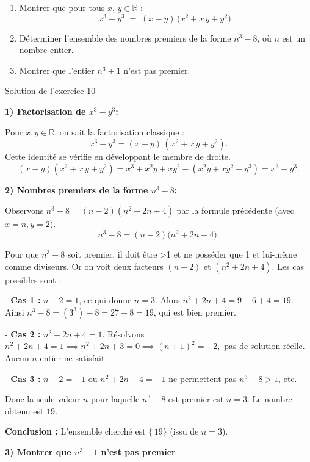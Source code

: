 \documentclass[a4paper,12pt]{article}
\begin{document}
\begin{exercice}[title=Exercice 10 $\star\star$ {[Calculer]}]
\begin{enumerate}
  \item Montrer que pour tous $x,\,y \in \mathbb{R}$ :
    $$
    x^3 - y^3 \;=\;(x - y)\,\bigl(x^2 + x\,y + y^2\bigr).
    $$
  \item Déterminer l'ensemble des nombres premiers de la forme $n^3 - 8$, où $n$ est un nombre entier.
  \item Montrer que l'entier $n^3+1$ n'est pas premier.
\end{enumerate}
\end{exercice}

\begin{solutionbox}{Solution de l'exercice 10}

\textbf{1) Factorisation de $x^3-y^3$:}

Pour $x,y\in\mathbb{R}$, on sait la factorisation classique :
\[
x^3 - y^3 = (x-y)\,(x^2 + x\,y + y^2).
\]
Cette identité se vérifie en développant le membre de droite.  
\[
(x-y)(x^2 + x\,y + y^2)=x^3 + x^2y + xy^2 - (x^2y +xy^2 +y^3)=x^3-y^3.
\]

\textbf{2) Nombres premiers de la forme $n^3-8$:}

Observons $n^3-8= (n-2)(n^2+2n+4)$ par la formule précédente (avec $x=n,y=2$).  
\[
n^3-8 = (n-2)\bigl(n^2 +2n +4\bigr).
\]

Pour que $n^3-8$ soit premier, il doit être >1 et ne posséder que 1 et lui-même comme diviseurs. Or on voit deux facteurs $(n-2)$ et $(n^2+2n+4)$.  
Les cas possibles sont :

- \textbf{Cas 1 :} $n-2=1$, ce qui donne $n=3$. Alors $n^2+2n+4= 9+6+4=19$.  
  Ainsi $n^3-8= (3^3)-8=27-8=19$, qui est bien premier.

- \textbf{Cas 2 :} $n^2+2n+4=1$.  
  Résolvons $n^2 +2n +4=1 \implies n^2+2n+3=0\implies (n+1)^2= -2,$ pas de solution réelle.  
  Aucun $n$ entier ne satisfait.

- \textbf{Cas 3 :} $n-2=-1$ ou $n^2+2n+4=-1$ ne permettent pas $n^3-8>1$, etc.

Donc la seule valeur $n$ pour laquelle $n^3-8$ est premier est $n=3$. Le nombre obtenu est $19$.

\textbf{Conclusion :} L’ensemble cherché est $\{\,19\}$ (issu de $n=3$).


\textbf{3) Montrer que $n^3+1$ n’est pas premier}


\end{solutionbox}
\end{document}

